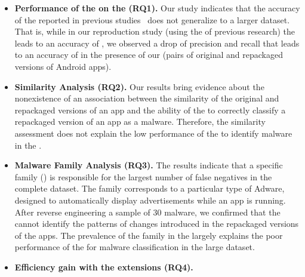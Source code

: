 \begin{itemize}
\item \textbf{Performance of the \mas on the \cds (RQ1).} 
  Our study indicates that the accuracy of the \mas reported in
  previous studies~\cite{DBLP:conf/wcre/BaoLL18,DBLP:journals/jss/CostaMMSSBNR22} does not
  generalize to a larger dataset. That is, while in our
  reproduction study (using the \sds of previous research) the \mas
  leads to an accuracy of \fscoreSmall, we observed a drop of precision and recall
  that leads to an accuracy of \fscore in the presence of our \cds (\apps pairs of
  original and repackaged versions of Android apps). 


\item \textbf{Similarity Analysis (RQ2).} Our results bring evidence about the nonexistence of an 
  association between the similarity of the original and repackaged versions of an app
  and the ability of the \mas to correctly
  classify a repackaged version of an app as a malware. Therefore,
  the similarity assessment does not explain the low
  performance of the \mas to identify malware in the \cds.

\item \textbf{Malware Family Analysis (RQ3).} The results indicate that a specific family
  (\gps)  is responsible for the largest number of false
  negatives in the complete dataset. The \gps family corresponds to a particular type of
  Adware, designed to automatically display advertisements while an app is running. After reverse engineering
  a sample of 30 \gps malware, we confirmed that the \mas cannot identify the
  patterns of changes introduced in the repackaged versions of the apps. The prevalence of the \gps family
  in the \cds largely explains the poor performance of the \mas for malware classification in the large dataset. 

\item \textbf{Efficiency gain with the \mas extensions (RQ4).}

\end{itemize}



